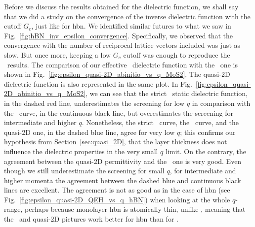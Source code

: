 Before we discuss the results obtained for the dielectric function, we shall say that we did a study on the convergence of the inverse dielectric function with the cutoff $G_c$, just like for \gls{hbn}.
We identified similar futures to what we saw in Fig.~\ref{fig:hBN_inv_epsilon_convergence}.
Specifically, we observed that the convergence with the number of reciprocal lattice vectors included was just as slow.
But once more, keeping a low $G_c$ cutoff was enough to reproduce the \abinit~results.
The comparison of our effective \bd~dielectric function with the \abinit~one is shown in Fig.~\ref{fig:epsilon_quasi-2D_abinitio_vs_q_MoS2}.
The quasi-2D dielectric function is also represented in the same plot.
In Fig.~\ref{fig:epsilon_quasi-2D_abinitio_vs_q_MoS2}, we can see that the strict \bd~static dielectric function, in the dashed red line, underestimates the screening for low $q$ in comparison with the \abinit~curve, in the continuous black line, but overestimates the screening for intermediate and higher $q$.
Nonetheless, the strict \bd~curve, the \abinit~curve, and the quasi-2D one, in the dashed blue line, agree for very low $q$; this confirms our hypothesis from Section~\ref{sec:quasi_2D}, that the layer thickness does not influence the dielectric properties in the very small $q$ limit.
On the contrary, the agreement between the quasi-2D permittivity and the \abinit~one is very good.
Even though we still underestimate the screening for small $q$, for intermediate and higher momenta the agreement between the dashed blue and continuous black lines are excellent.
The agreement is not as good as in the case of \gls{hbn} (see Fig.~\ref{fig:epsilon_quasi-2D_QEH_vs_q_hBN}) when looking at the whole $q$-range, perhaps because monolayer \gls{hbn} is atomically thin, unlike , meaning that the \bd~and quasi-2D pictures work better for \gls{hbn} than for .

